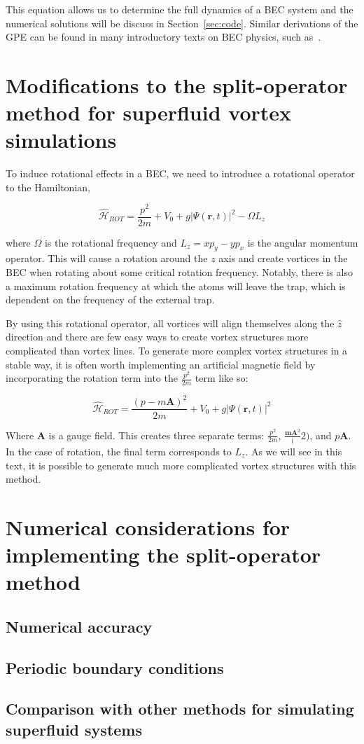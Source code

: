 This equation allows us to determine the full dynamics of a BEC system and the numerical solutions will be discuss in Section~\ref{sec:code}. Similar derivations of the GPE can be found in many introductory texts on BEC physics, such as~\cite{Fetter2003,  Pethick2002, Fetter2009}.

\section{Modifications to the split-operator method for superfluid vortex simulations}

To induce rotational effects in a BEC, we need to introduce a rotational operator to the Hamiltonian,

$$
\mathcal{\hat H}_{ROT} = \frac{p^2}{2m} + V_0 + g|\Psi(\mathbf{r},t)|^2 - \Omega L_z
$$

where $\Omega$ is the rotational frequency and $L_z = xp_y - yp_x$ is the angular momentum operator.
This will cause a rotation around the $z$ axis and create vortices in the BEC when rotating about some critical rotation frequency.
Notably, there is also a maximum rotation frequency at which the atoms will leave the trap, which is dependent on the frequency of the external trap.

By using this rotational operator, all vortices will align themselves along the $\hat z$ direction and there are few easy ways to create vortex structures more complicated than vortex lines.
To generate more complex vortex structures in a stable way, it is often worth implementing an artificial magnetic field by incorporating the rotation term into the $\frac{p^2}{2m}$ term like so:

$$
\mathcal{\hat H}_{ROT} = \frac{(p-m\mathbf{A})^2}{2m} + V_0 + g|\Psi(\mathbf{r},t)|^2
$$

Where $\mathbf{A}$ is a gauge field.
This creates three separate terms: $\frac{p^2}{2m}$, $\frac{\mathbf{mA}^2}(2)$, and $p\mathbf{A}$.
In the case of rotation, the final term corresponds to $L_z$.
As we will see in this text, it is possible to generate much more complicated vortex structures with this method.

\section{Numerical considerations for implementing the split-operator method}

\subsection{Numerical accuracy}

\subsection{Periodic boundary conditions}

\subsection{Comparison with other methods for simulating superfluid systems}
